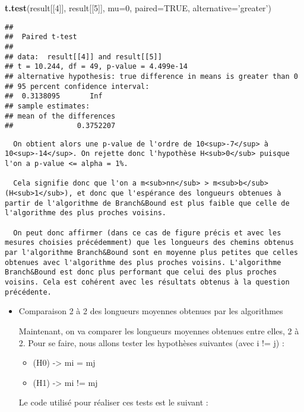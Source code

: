 \documentclass[
]{article}
\newenvironment{Shaded}{\begin{snugshade}}{\end{snugshade}}
\newcommand{\DataTypeTok}[1]{\textcolor[rgb]{0.13,0.29,0.53}{#1}}
\newcommand{\DecValTok}[1]{\textcolor[rgb]{0.00,0.00,0.81}{#1}}
\newcommand{\KeywordTok}[1]{\textcolor[rgb]{0.13,0.29,0.53}{\textbf{#1}}}
\newcommand{\NormalTok}[1]{#1}
\newcommand{\OtherTok}[1]{\textcolor[rgb]{0.56,0.35,0.01}{#1}}
\newcommand{\StringTok}[1]{\textcolor[rgb]{0.31,0.60,0.02}{#1}}
\providecommand{\tightlist}{%
  \setlength{\itemsep}{0pt}\setlength{\parskip}{0pt}}
\begin{document}
\begin{Shaded}
\begin{Highlighting}[]
  \KeywordTok{t.test}\NormalTok{(result[[}\DecValTok{4}\NormalTok{]], result[[}\DecValTok{5}\NormalTok{]], }\DataTypeTok{mu=}\DecValTok{0}\NormalTok{, }\DataTypeTok{paired=}\OtherTok{TRUE}\NormalTok{, }\DataTypeTok{alternative=}\StringTok{'greater'}\NormalTok{)}
\end{Highlighting}
\end{Shaded}

\begin{verbatim}
## 
##  Paired t-test
## 
## data:  result[[4]] and result[[5]]
## t = 10.244, df = 49, p-value = 4.499e-14
## alternative hypothesis: true difference in means is greater than 0
## 95 percent confidence interval:
##  0.3138095       Inf
## sample estimates:
## mean of the differences 
##               0.3752207
\end{verbatim}

\begin{verbatim}
  On obtient alors une p-value de l'ordre de 10<sup>-7</sup> à 10<sup>-14</sup>. On rejette donc l'hypothèse H<sub>0</sub> puisque l'on a p-value <= alpha = 1%.

  Cela signifie donc que l'on a m<sub>nn</sub> > m<sub>b</sub> (H<sub>1</sub>), et donc que l'espérance des longueurs obtenues à partir de l'algorithme de Branch&Bound est plus faible que celle de l'algorithme des plus proches voisins.

  On peut donc affirmer (dans ce cas de figure précis et avec les mesures choisies précédemment) que les longueurs des chemins obtenus par l'algorithme Branch&Bound sont en moyenne plus petites que celles obtenues avec l'algorithme des plus proches voisins. L'algorithme Branch&Bound est donc plus performant que celui des plus proches voisins. Cela est cohérent avec les résultats obtenus à la question précédente.
\end{verbatim}

\begin{itemize}
\item
  Comparaison 2 à 2 des longueurs moyennes obtenues par les algorithmes

  Maintenant, on va comparer les longueurs moyennes obtenues entre
  elles, 2 à 2. Pour se faire, nous allons tester les hypothèses
  suivantes (avec i != j) :

  \begin{itemize}
  \tightlist
  \item
    (H0) -\textgreater{} mi = mj
  \item
    (H1) -\textgreater{} mi != mj
  \end{itemize}

  Le code utilisé pour réaliser ces tests est le suivant :
\end{itemize}
\end{document}
